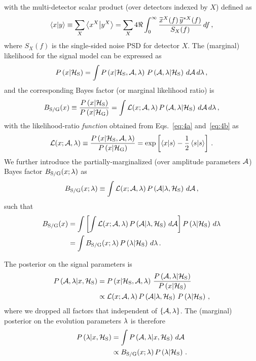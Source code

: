 \documentclass[aps,prd,onecolumn,notitlepage,nofootinbib,superscriptaddress,altaffilletter,floatfix]{revtex4-1}
\begin{document}
with the multi-detector scalar product (over detectors indexed by $X$) defined as
\begin{equation}
  \label{eq:5}
  \left\langle x\middle|y\right\rangle\equiv \sum_{X} \left\langle x^X\middle|y^X\right\rangle = \sum_X 4\Re\int_{0}^{\infty} \frac{\widetilde{x}^X(f)\,\widetilde{y}^{*X}(f)}{S_X(f)}\,df\,,
\end{equation}
where $S_X(f)$ is the single-sided noise PSD for detector $X$.
The (marginal) likelihood for the signal model can be expressed as
\begin{equation}
  \label{eq:6}
  P\left(x\middle|\mathcal{H}_{\mathrm{S}}\right) = \int P\left(x\middle|\mathcal{H}_{\mathrm{S}},{\mathcal A},\lambda\right)\,P\left({\mathcal A},\lambda\middle|\mathcal{H}_{\mathrm{S}}\right)\,d{\mathcal A}\,d\lambda\,,
\end{equation}
and the corresponding Bayes factor (or marginal likelihood ratio) is
\begin{equation}
  \label{eq:7}
  B_{\mathrm{S/G}}(x) \equiv \frac{P\left(x\middle|\mathcal{H}_{\mathrm{S}}\right)}{P\left(x\middle|\mathcal{H}_{\mathrm{G}}\right)} = \int \mathcal{L}(x;{\mathcal A},\lambda)\,P\left({\mathcal A},\lambda\middle|\mathcal{H}_{\mathrm{S}}\right)\,d{\mathcal A}\,d\lambda\,,
\end{equation}
with the likelihood-ratio \emph{function} obtained from Eqs.~\eqref{eq:4a} and~\eqref{eq:4b} as
\begin{equation}
  \label{eq:8}
  \mathcal{L}(x;{\mathcal A},\lambda) \equiv \frac{P\left(x\middle|\mathcal{H}_{\mathrm{S}},{\mathcal A},\lambda\right)}{P\left(x\middle|\mathcal{H}_{\mathrm{G}}\right)} = \exp\left[\left\langle x\middle|s\right\rangle - \frac{1}{2}\left\langle s\middle|s\right\rangle\right]\,.
\end{equation}
We further introduce the partially-marginalized (over amplitude parameters ${\mathcal A}$) Bayes factor $B_{\mathrm{S/G}}(x;\lambda)$ as
\begin{equation}
  B_{\mathrm{S/G}}(x;\lambda) \equiv \int \mathcal{L}(x;{\mathcal A},\lambda) \, P\left({\mathcal A}\middle|\lambda,\mathcal{H}_{\mathrm{S}}\right)\,d{\mathcal A}\,,  \label{eq:23b}
\end{equation}
such that
\begin{align}
  B_{\mathrm{S/G}}(x) &= \int \left[ \int \mathcal{L}(x;{\mathcal A},\lambda)\,P\left({\mathcal A}\middle|\lambda,\mathcal{H}_{\mathrm{S}}\right)\,d{\mathcal A}\right] P\left(\lambda\middle|\mathcal{H}_{\mathrm{S}}\right) \,d\lambda \notag\\
          &= \int B_{\mathrm{S/G}}(x;\lambda) \,P\left(\lambda\middle|\mathcal{H}_{\mathrm{S}}\right)\,d\lambda\,.   \label{eq:23a}
\end{align}

The posterior on the signal parameters is
\begin{align}
  \label{eq:49}
  P\left({\mathcal A},\lambda\middle|x,\mathcal{H}_{\mathrm{S}}\right) &= P\left(x\middle|\mathcal{H}_{\mathrm{S}},{\mathcal A},\lambda\right)\,\frac{P\left({\mathcal A},\lambda\middle|\mathcal{H}_{\mathrm{S}}\right)}{P\left(x\middle|\mathcal{H}_{\mathrm{S}}\right)} \notag\\
    &\propto \mathcal{L}(x;{\mathcal A},\lambda)\,P\left({\mathcal A}\middle|\lambda,\mathcal{H}_{\mathrm{S}}\right)\,P\left(\lambda\middle|\mathcal{H}_{\mathrm{S}}\right)\,,
\end{align}
where we dropped all factors that independent of $\{{\mathcal A},\lambda\}$.
The (marginal) posterior on the evolution parameters $\lambda$ is therefore
\begin{align}
  \label{eq:50}
  P\left(\lambda\middle|x,\mathcal{H}_{\mathrm{S}}\right) &= \int P\left({\mathcal A},\lambda\middle|x,\mathcal{H}_{\mathrm{S}}\right)\,d{\mathcal A} \notag\\
  &\propto B_{\mathrm{S/G}}(x;\lambda) \,P\left(\lambda\middle|\mathcal{H}_{\mathrm{S}}\right)\,.
\end{align}
\end{document}

